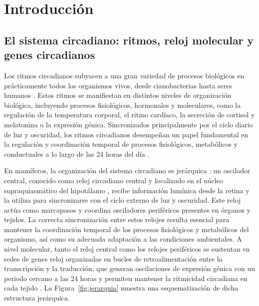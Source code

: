 \documentclass[12pt, a4paper]{report}
\begin{document}
\tableofcontents
\newpage
\listoffigures
\newpage
\listoftables
\newpage


\chapter{Introducción}

\section{El sistema circadiano: ritmos, reloj molecular y genes circadianos}
Los ritmos circadianos subyacen a una gran variedad de procesos biológicos en prácticamente todos los organismos vivos, desde cianobacterias hasta seres humanos \cite{bell-pedersen2005}. Estos ritmos se manifiestan en distintos niveles de organización biológica, incluyendo procesos fisiológicos, hormonales y moleculares, como la regulación de la temperatura corporal, el ritmo cardíaco, la secreción de cortisol y melatonina o la expresión génica. Sincronizados principalmente por el ciclo diario de luz y oscuridad, los ritmos circadianos desempeñan un papel fundamental en la regulación y coordinación temporal de procesos fisiológicos, metabólicos y conductuales a lo largo de las 24 horas del día \cite{takahashi2017, halberg1969, mohawk2012, mure2018}.

En mamíferos, la organización del sistema circadiano es jerárquica \cite{gomezabellan2012}: un oscilador central, conocido como reloj circadiano central y localizado en el núcleo supraquiasmático del hipotálamo \cite{klein1991}, recibe información lumínica desde la retina y la utiliza para sincronizarse con el ciclo externo de luz y oscuridad. Este reloj actúa como marcapasos y coordina osciladores periféricos presentes en órganos y tejidos. La correcta sincronización entre estos relojes resulta esencial para mantener la coordinación temporal de los procesos fisiológicos y metabólicos del organismo, así como su adecuada adaptación a las condiciones ambientales. A nivel molecular, tanto el reloj central como los relojes periféricos se sustentan en redes de genes reloj organizadas en bucles de retroalimentación entre la transcripción y la traducción, que generan oscilaciones de expresión génica con un periodo cercano a las 24 horas y permiten mantener la ritmicidad circadiana en cada tejido \cite{takahashi2017, ueda2005}. La Figura~\ref{fig:jerarquia} muestra una esquematización de dicha estructura jerárquica.
\end{document}
